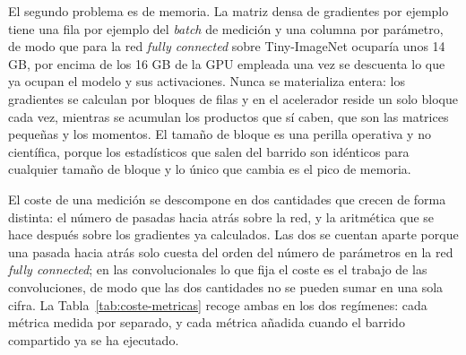 El segundo problema es de memoria. La matriz densa de gradientes por ejemplo tiene una fila por ejemplo del \emph{batch} de medición y una columna por parámetro, de modo que para la red \emph{fully connected} sobre Tiny-ImageNet ocuparía unos 14 GB, por encima de los 16 GB de la GPU empleada una vez se descuenta lo que ya ocupan el modelo y sus activaciones. Nunca se materializa entera: los gradientes se calculan por bloques de filas y en el acelerador reside un solo bloque cada vez, mientras se acumulan los productos que sí caben, que son las matrices pequeñas y los momentos. El tamaño de bloque es una perilla operativa y no científica, porque los estadísticos que salen del barrido son idénticos para cualquier tamaño de bloque y lo único que cambia es el pico de memoria.

El coste de una medición se descompone en dos cantidades que crecen de forma distinta: el número de pasadas hacia atrás sobre la red, y la aritmética que se hace después sobre los gradientes ya calculados. Las dos se cuentan aparte porque una pasada hacia atrás solo cuesta del orden del número de parámetros en la red \emph{fully connected}; en las convolucionales lo que fija el coste es el trabajo de las convoluciones, de modo que las dos cantidades no se pueden sumar en una sola cifra. La Tabla~\ref{tab:coste-metricas} recoge ambas en los dos regímenes: cada métrica medida por separado, y cada métrica añadida cuando el barrido compartido ya se ha ejecutado.

